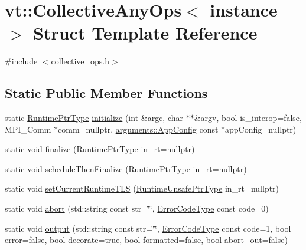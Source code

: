 \hypertarget{structvt_1_1_collective_any_ops}{}\section{vt\+:\+:Collective\+Any\+Ops$<$ instance $>$ Struct Template Reference}
\label{structvt_1_1_collective_any_ops}


{\ttfamily \#include $<$collective\+\_\+ops.\+h$>$}

\subsection*{Static Public Member Functions}
\begin{DoxyCompactItemize}
\item 
static \hyperlink{namespacevt_a0ce60e0299d8fa32223b3b9ffa0af466}{Runtime\+Ptr\+Type} \hyperlink{structvt_1_1_collective_any_ops_aadcc1fe5e20336eebcd28d5800700cc4}{initialize} (int \&argc, char $\ast$$\ast$\&argv, bool is\+\_\+interop=false, M\+P\+I\+\_\+\+Comm $\ast$comm=nullptr, \hyperlink{structvt_1_1arguments_1_1_app_config}{arguments\+::\+App\+Config} const $\ast$app\+Config=nullptr)
\item 
static void \hyperlink{structvt_1_1_collective_any_ops_ae2260154e455458fc26f02f0bce6702d}{finalize} (\hyperlink{namespacevt_a0ce60e0299d8fa32223b3b9ffa0af466}{Runtime\+Ptr\+Type} in\+\_\+rt=nullptr)
\item 
static void \hyperlink{structvt_1_1_collective_any_ops_af1fb099b2441c194dd22f02da8ef46d9}{schedule\+Then\+Finalize} (\hyperlink{namespacevt_a0ce60e0299d8fa32223b3b9ffa0af466}{Runtime\+Ptr\+Type} in\+\_\+rt=nullptr)
\item 
static void \hyperlink{structvt_1_1_collective_any_ops_aa86dfdc9c8ac6f25033948b5dd26fb5b}{set\+Current\+Runtime\+T\+LS} (\hyperlink{namespacevt_a8019b70cc4b9b0833c38559c85dfd53b}{Runtime\+Unsafe\+Ptr\+Type} in\+\_\+rt=nullptr)
\item 
static void \hyperlink{structvt_1_1_collective_any_ops_a31a089ab739c612171e581ead8922e8b}{abort} (std\+::string const str=\char`\"{}\char`\"{}, \hyperlink{namespacevt_a793764d753923abc3d32929870beb485}{Error\+Code\+Type} const code=0)
\item 
static void \hyperlink{structvt_1_1_collective_any_ops_a5ae4676659166ab1e1ac7334776d58c3}{output} (std\+::string const str=\char`\"{}\char`\"{}, \hyperlink{namespacevt_a793764d753923abc3d32929870beb485}{Error\+Code\+Type} const code=1, bool error=false, bool decorate=true, bool formatted=false, bool abort\+\_\+out=false)
\end{DoxyCompactItemize}


